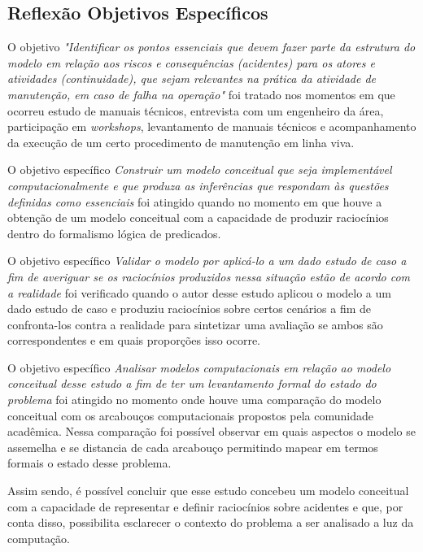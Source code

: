 \subsection{Reflexão Objetivos Específicos}\label{reflexobespecifico}


O objetivo \textit{"Identificar os pontos essenciais que devem fazer parte da estrutura do modelo em relação aos riscos e consequências (acidentes) para os atores e atividades (continuidade), que sejam relevantes na prática da atividade de manutenção, em caso de falha na operação"} foi tratado nos momentos em que ocorreu estudo de manuais técnicos, entrevista com um engenheiro da área, participação em \textit{workshops}, levantamento de manuais técnicos e acompanhamento da execução de um certo procedimento de manutenção em linha viva.  

O objetivo específico \textit{Construir um modelo conceitual que seja implementável computacionalmente e que produza as inferências que respondam às questões definidas como essenciais} foi atingido quando no momento em que houve a obtenção de um modelo conceitual com a capacidade de produzir raciocínios dentro do formalismo lógica de predicados. 

O objetivo específico \textit{Validar o modelo por aplicá-lo a um dado estudo de caso a fim de averiguar se os raciocínios produzidos nessa situação estão de acordo com a realidade} foi verificado quando o autor desse estudo aplicou o modelo a um dado estudo de caso e produziu raciocínios sobre certos cenários a fim de confronta-los contra a realidade para sintetizar uma avaliação se ambos são correspondentes e em quais proporções isso ocorre. 

O objetivo específico \textit{Analisar modelos computacionais em relação ao modelo conceitual desse estudo a fim de ter um levantamento formal do estado do problema} foi atingido no momento onde houve uma comparação do modelo conceitual com os arcabouços computacionais propostos pela comunidade acadêmica. Nessa comparação foi possível observar em quais aspectos o modelo se assemelha e se distancia de cada arcabouço permitindo mapear em termos formais o estado desse problema. 

Assim sendo, é possível concluir que esse estudo concebeu um modelo conceitual com a capacidade de representar e definir raciocínios sobre acidentes e que, por conta disso, possibilita esclarecer o contexto do problema a ser analisado a luz da computação. 
